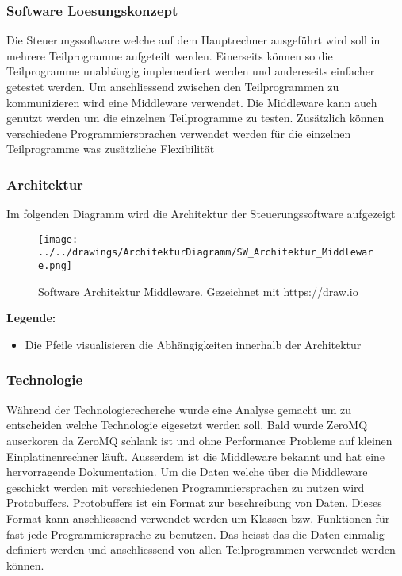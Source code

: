 \documentclass[../../main.tex]{subfiles}
\begin{document}
\subsubsection{Software Loesungskonzept}
Die Steuerungssoftware welche auf dem Hauptrechner ausgeführt wird soll in mehrere Teilprogramme aufgeteilt werden.
Einerseits können so die Teilprogramme unabhängig implementiert werden und andereseits einfacher getestet werden.
Um anschliessend zwischen den Teilprogrammen zu kommunizieren wird eine Middleware verwendet. Die Middleware kann auch genutzt werden
um die einzelnen Teilprogramme zu testen. Zusätzlich können verschiedene Programmiersprachen verwendet werden für die einzelnen Teilprogramme
was zusätzliche Flexibilität

\subsubsection{Architektur}
Im folgenden Diagramm wird die Architektur der Steuerungssoftware aufgezeigt
\begin{figure}[H] %
    \centering
    \texttt{[image: ../../drawings/ArchitekturDiagramm/SW\_Architektur\_Middleware.png]}
    \caption {Software Architektur Middleware. Gezeichnet mit https://draw.io}
\end{figure}

\textbf{Legende:}
\begin{itemize}
    \item Die Pfeile visualisieren die Abhängigkeiten innerhalb der Architektur
\end{itemize}

\subsubsection{Technologie}
Während der Technologierecherche wurde eine Analyse gemacht um zu entscheiden welche Technologie eigesetzt werden soll. Bald wurde ZeroMQ
auserkoren da ZeroMQ schlank ist und ohne Performance Probleme auf kleinen Einplatinenrechner läuft. Ausserdem ist die Middleware bekannt
und hat eine hervorragende Dokumentation. Um die Daten welche über die Middleware geschickt werden mit verschiedenen Programmiersprachen zu
nutzen wird Protobuffers. Protobuffers ist ein Format zur beschreibung von Daten. Dieses Format kann anschliessend verwendet werden um
Klassen bzw. Funktionen für fast jede Programmiersprache zu benutzen. Das heisst das die Daten einmalig definiert werden und anschliessend von
allen Teilprogrammen verwendet werden können.
\end{document}
